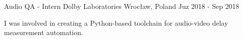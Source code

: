 \begin{cventries}
  \cventry
    {Audio QA - Intern} %
    {Dolby Laboratories} %
    {Wrocław, Poland} %
    {Juz 2018 - Sep 2018} %
    {
      \begin{cvitems} %
        \item {I was involved in creating a Python-based toolchain for audio-video delay measurement automation.}
      \end{cvitems}
    }

\end{cventries}

